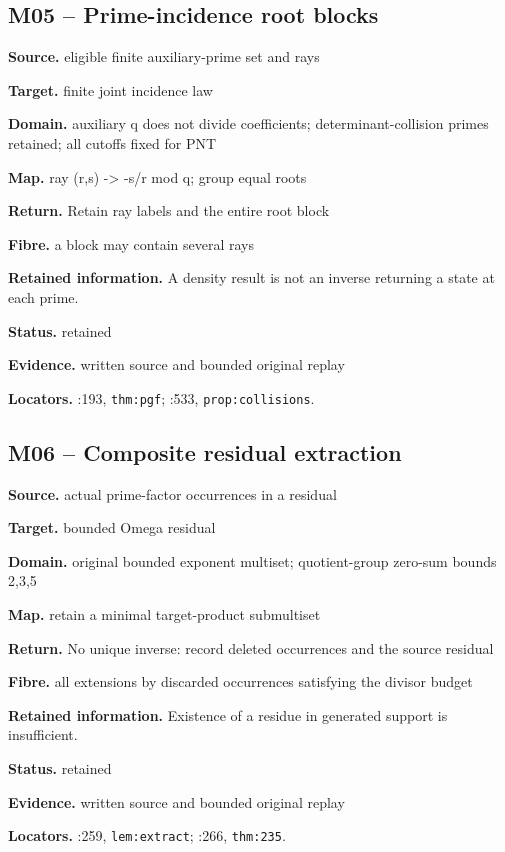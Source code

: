 \subsection*{M05 -- Prime-incidence root blocks}
\noindent\textbf{Source.} eligible finite auxiliary-prime set and rays\par
\noindent\textbf{Target.} finite joint incidence law\par
\noindent\textbf{Domain.} auxiliary q does not divide coefficients; determinant-collision primes retained; all cutoffs fixed for PNT\par
\noindent\textbf{Map.} ray (r,s) -> -s/r mod q; group equal roots\par
\noindent\textbf{Return.} Retain ray labels and the entire root block\par
\noindent\textbf{Fibre.} a block may contain several rays\par
\noindent\textbf{Retained information.} A density result is not an inverse returning a state at each prime.\par
\noindent\textbf{Status.} retained\par
\noindent\textbf{Evidence.} written source and bounded original replay\par
\noindent\textbf{Locators.} :193, \texttt{thm:pgf}; :533, \texttt{prop:collisions}.
\subsection*{M06 -- Composite residual extraction}
\noindent\textbf{Source.} actual prime-factor occurrences in a residual\par
\noindent\textbf{Target.} bounded Omega residual\par
\noindent\textbf{Domain.} original bounded exponent multiset; quotient-group zero-sum bounds 2,3,5\par
\noindent\textbf{Map.} retain a minimal target-product submultiset\par
\noindent\textbf{Return.} No unique inverse: record deleted occurrences and the source residual\par
\noindent\textbf{Fibre.} all extensions by discarded occurrences satisfying the divisor budget\par
\noindent\textbf{Retained information.} Existence of a residue in generated support is insufficient.\par
\noindent\textbf{Status.} retained\par
\noindent\textbf{Evidence.} written source and bounded original replay\par
\noindent\textbf{Locators.} :259, \texttt{lem:extract}; :266, \texttt{thm:235}.
